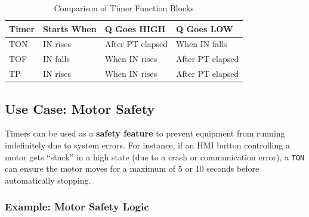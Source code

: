 \documentclass[11pt,a4paper]{article}
\begin{document}
\begin{table}[h]
\centering
\begin{tabular}{@{}llll@{}}
\toprule
\textbf{Timer} & \textbf{Starts When} & \textbf{Q Goes HIGH} & \textbf{Q Goes LOW} \\
\midrule
TON & IN rises & After PT elapsed & When IN falls \\
TOF & IN falls & When IN rises & After PT elapsed \\
TP & IN rises & When IN rises & After PT elapsed \\
\bottomrule
\end{tabular}
\caption{Comparison of Timer Function Blocks}
\end{table}

\subsection{Use Case: Motor Safety}

Timers can be used as a \textbf{safety feature} to prevent equipment from running indefinitely due to system errors. For instance, if an HMI button controlling a motor gets ``stuck'' in a high state (due to a crash or communication error), a \texttt{TON} can ensure the motor moves for a maximum of 5 or 10 seconds before automatically stopping.

\subsubsection*{Example: Motor Safety Logic}
\end{document}
